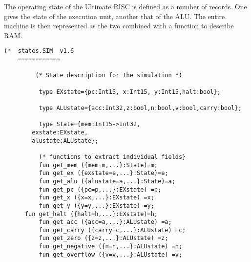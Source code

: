 The operating state of the Ultimate RISC is defined as a number of records.
One gives the state of the execution unit, another that of the ALU.
The entire machine is then represented as the two combined with a function to describe RAM.
\begin{verbatim}
(* 	states.SIM	v1.6
	============

         (* State description for the simulation *)

          type EXstate={pc:Int15, x:Int15, y:Int15,halt:bool};

          type ALUstate={acc:Int32,z:bool,n:bool,v:bool,carry:bool};

          type State={mem:Int15->Int32,
		exstate:EXstate,
		alustate:ALUstate};

          (* functions to extract individual fields}
          fun get_mem ({mem=m,...}:State)=m;
          fun get_ex ({exstate=e,...}:State)=e;
          fun get_alu ({alustate=a,...}:State)=a;
          fun get_pc ({pc=p,...}:EXstate) =p;
          fun get_x ({x=x,...}:EXstate) =x;
          fun get_y ({y=y,...}:EXstate) =y;
	  fun get_halt ({halt=h,...}:EXstate)=h;
          fun get_acc ({acc=a,...}:ALUstate) =a;
          fun get_carry ({carry=c,...}:ALUstate) =c;
          fun get_zero ({z=z,...}:ALUstate) =z;
          fun get_negative ({n=n,...}:ALUstate) =n;
          fun get_overflow ({v=v,...}:ALUstate) =v;
\end{verbatim} 
